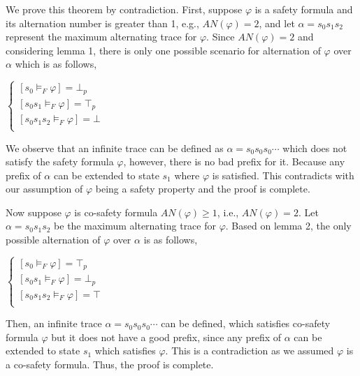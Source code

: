 We prove this theorem by contradiction. First, suppose $\varphi$ is a safety formula and its alternation number is greater than 1, e.g., $AN(\varphi) = 2$, and let $\alpha = s_0 s_1 s_2$ represent the maximum alternating trace for $\varphi$.  Since $AN(\varphi) = 2$ and considering lemma 1, there is only one possible scenario for alternation of $\varphi$ over $\alpha$ which is as follows,\\ 


\begin{center}
$\left.
\begin{cases}
[s_0 \models_F \varphi] = \bot_p\\
[s_0 s_1 \models_F \varphi] = \top_p\\
[s_0 s_1 s_2 \models_F \varphi] = \bot \\
\end{cases}
\right.
$
\end{center}

We observe that an infinite trace can be defined as $ \alpha = s_0 s_0 s_0 \cdots $ which does not satisfy the safety formula $\varphi$, however, there is no bad prefix for it. Because any prefix of $\alpha$ can be extended to state $s_1$ where $\varphi$ is satisfied. This contradicts with our assumption of $\varphi$ being a safety property and the proof is complete. 

Now suppose $\varphi$ is co-safety formula $AN(\varphi) \geq 1$, i.e., $AN(\varphi) = 2$. Let $\alpha = s_0 s_1 s_2$ be the maximum alternating trace for $\varphi$. Based on lemma 2, the only possible alternation of $\varphi$ over $\alpha$ is as follows,

\begin{center}
$\left.
\begin{cases}
[s_0 \models_F \varphi] = \top_p\\
[s_0 s_1 \models_F \varphi] = \bot_p\\
[s_0 s_1 s_2 \models_F \varphi] = \top \\
\end{cases}
\right.
$
\end{center}

Then, an infinite trace $ \alpha = s_0 s_0 s_0 \cdots $ can be defined, which satisfies co-safety formula $\varphi$ but it does not have a good prefix, since any prefix of $\alpha$ can be extended to state $s_1$ which satisfies $\varphi$. This is a contradiction as we assumed $\varphi$ is a co-safety formula. Thus, the proof is complete.


~\\


